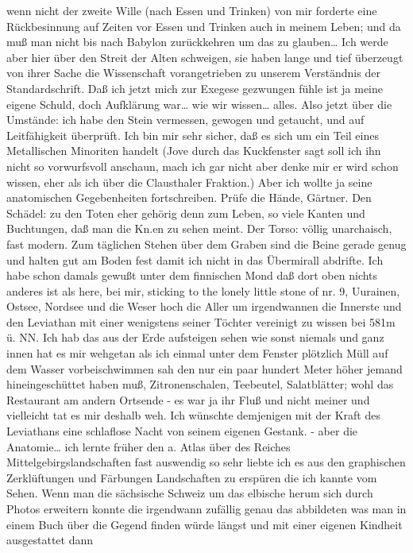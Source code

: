 \documentclass[
]{article}
\begin{document}
wenn nicht der zweite Wille (nach Essen und Trinken) von mir forderte
eine Rückbesinnung auf Zeiten vor Essen und Trinken auch in meinem
Leben; und da muß man nicht bis nach Babylon zurückkehren um das zu
glauben\ldots{} Ich werde aber hier über den Streit der Alten schweigen,
sie haben lange und tief überzeugt von ihrer Sache die Wissenschaft
vorangetrieben zu unserem Verständnis der Standardschrift. Daß ich jetzt
mich zur Exegese gezwungen fühle ist ja meine eigene Schuld, doch
Aufklärung war\ldots{} wie wir wissen\ldots{} alles. Also jetzt über die
Umstände: ich habe den Stein vermessen, gewogen und getaucht, und auf
Leitfähigkeit überprüft. Ich bin mir sehr sicher, daß es sich um ein
Teil eines Metallischen Minoriten handelt (Jove durch das Kuckfenster
sagt soll ich ihn nicht so vorwurfsvoll anschaun, mach ich gar nicht
aber denke mir er wird schon wissen, eher als ich über die Clausthaler
Fraktion.) Aber ich wollte ja seine anatomischen Gegebenheiten
fortschreiben. Prüfe die Hände, Gärtner. Den Schädel: zu den Toten eher
gehörig denn zum Leben, so viele Kanten und Buchtungen, daß man die
Kn.en zu sehen meint. Der Torso: völlig unarchaisch, fast modern. Zum
täglichen Stehen über dem Graben sind die Beine gerade genug und halten
gut am Boden fest damit ich nicht in das Übermirall abdrifte. Ich habe
schon damals gewußt unter dem finnischen Mond daß dort oben nichts
anderes ist als here, bei mir, sticking to the lonely little stone of
nr. 9, Uurainen, Ostsee, Nordsee und die Weser hoch die Aller um
irgendwannen die Innerste und den Leviathan mit einer wenigstens seiner
Töchter vereinigt zu wissen bei 581m ü. NN. Ich hab das aus der Erde
aufsteigen sehen wie sonst niemals und ganz innen hat es mir wehgetan
als ich einmal unter dem Fenster plötzlich Müll auf dem Wasser
vorbeischwimmen sah den nur ein paar hundert Meter höher jemand
hineingeschüttet haben muß, Zitronenschalen, Teebeutel, Salatblätter;
wohl das Restaurant am andern Ortsende - es war ja ihr Fluß und nicht
meiner und vielleicht tat es mir deshalb weh. Ich wünschte demjenigen
mit der Kraft des Leviathans eine schlaflose Nacht von seinem eigenen
Gestank. - aber die Anatomie\ldots{} ich lernte früher den a. Atlas über
des Reiches Mittelgebirgslandschaften fast auswendig so sehr liebte ich
es aus den graphischen Zerklüftungen und Färbungen Landschaften zu
erspüren die ich kannte vom Sehen. Wenn man die sächsische Schweiz um
das elbische herum sich durch Photos erweitern konnte die irgendwann
zufällig genau das abbildeten was man in einem Buch über die Gegend
finden würde längst und mit einer eigenen Kindheit ausgestattet dann
\end{document}
